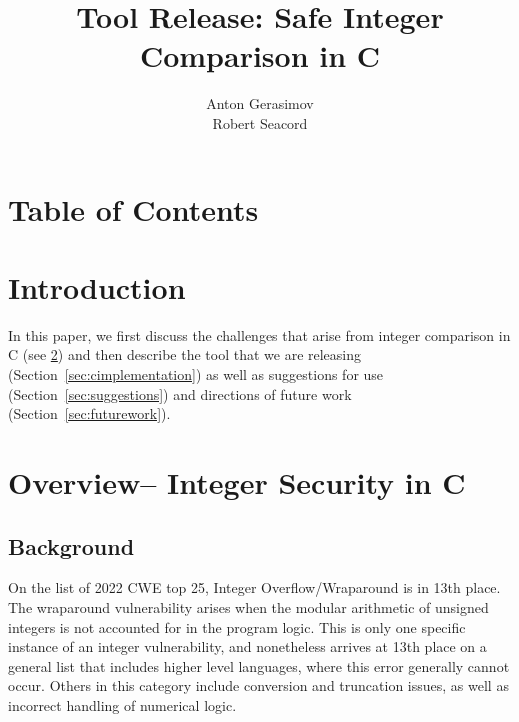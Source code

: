 \documentclass[11pt,letterpaper]{article}
\title{Tool Release: Safe Integer Comparison in C}
\author{Anton Gerasimov\\
Robert Seacord}
\begin{document}
\maketitle
\newpage
\thispagestyle{fancy}
\clearpage
\section*{Table of Contents}
\makeatletter
\renewcommand\tableofcontents{\@starttoc{toc}} %
\makeatother
\bgroup%
\hypersetup{linkcolor=black}%
\tableofcontents
\egroup%
\thispagestyle{nccsection}
\pagebreak


\section{Introduction}

In this paper, we first discuss the challenges that arise from integer comparison in C (see
\ref{sec:overview}) and then describe the tool that we are releasing (Section~\ref{sec:cimplementation}) as well as suggestions for use (Section~\ref{sec:suggestions}) and directions of future work (Section~\ref{sec:futurework}).



\section{Overview– Integer Security in C}
\label{sec:overview}


\subsection{Background }
\Blindtext[2]
On the list of 2022 CWE top 25, Integer Overflow/Wraparound is in 13th place. The wraparound vulnerability arises when the modular arithmetic of unsigned integers is not accounted for in the program logic. This is only one specific instance of an integer vulnerability, and nonetheless arrives at 13th place on a  general list that includes higher level languages, where this error generally cannot occur. Others in this category include conversion and truncation issues, as well as incorrect handling of numerical logic. 
\end{document}
